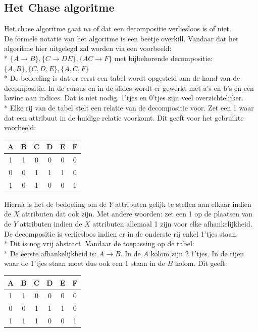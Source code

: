 \documentclass[10pt]{article}
\begin{document}
\subsection{Het Chase algoritme}
Het chase algoritme gaat na of dat een decompositie verliesloos is of niet.\\
De formele notatie van het algoritme is een beetje overkill. Vandaar dat het algoritme hier uitgelegd zal worden via een voorbeeld:\\*
$\{A \rightarrow B\}, \{C \rightarrow DE\}, \{AC \rightarrow F\}$ met bijbehorende decompositie: $\{A, B\}, \{C, D, E\}, \{A, C, F\}$\\*
De bedoeling is dat er eerst een tabel wordt opgesteld aan de hand van de decompositie. In de cursus en in de slides wordt er gewerkt met a's en b's en een lawine aan indices. Dat is niet nodig. 1'tjes en 0'tjes zijn veel overzichtelijker.\\*
Elke rij van de tabel stelt een relatie van de decompositie voor. Zet een 1 waar dat een attribuut in de huidige relatie voorkomt. Dit geeft voor het gebruikte voorbeeld:
\begin{center}
\begin{tabular}{| c | c | c | c | c | c |} \hline
  A & B & C & D & E & F\\ \hline
  1 & 1 & 0 & 0 & 0 & 0\\ \hline
  0 & 0 & 1 & 1 & 1 & 0\\ \hline
  1 & 0 & 1 & 0 & 0 & 1\\ \hline
\end{tabular}
\end{center}
Hierna is het de bedoeling om de $Y$ attributen gelijk te stellen aan elkaar indien de $X$ attributen dat ook zijn. Met andere woorden: zet een 1 op de plaatsen van de $Y$ attributen indien de $X$ attributen allemaal 1 zijn voor elke afhankelijkheid. De decompositie is verliesloos indien er in de onderste rij enkel 1'tjes staan.\\*
Dit is nog vrij abstract. Vandaar de toepassing op de tabel:\\*
De eerste afhankelijkheid is: $A \rightarrow B$. In de $A$ kolom zijn 2 1'tjes. In de rijen waar de 1'tjes staan moet dus ook een 1 staan in de $B$ kolom. Dit geeft:
\begin{center}
\begin{tabular}{| c | c | c | c | c | c |} \hline
  A & B & C & D & E & F\\ \hline
  1 & 1 & 0 & 0 & 0 & 0\\ \hline
  0 & 0 & 1 & 1 & 1 & 0\\ \hline
  1 & 1 & 1 & 0 & 0 & 1\\ \hline
\end{tabular}
\end{center}
\end{document}
